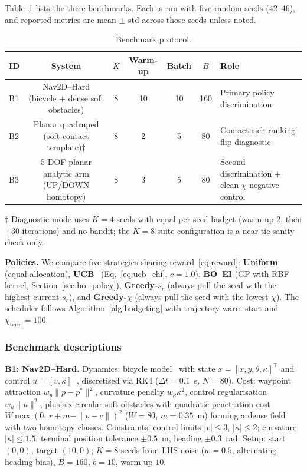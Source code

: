 \documentclass[lettersize,journal]{IEEEtran}
\begin{document}
Table~\ref{tab:protocol} lists the three benchmarks.  Each is run with
five random seeds ($42$--$46$), and reported metrics are mean $\pm$ std
across those seeds unless noted.

\begin{table}[t]
\caption{Benchmark protocol.}
\label{tab:protocol}
\centering
\footnotesize
\setlength{\tabcolsep}{3pt}
\begin{tabular}{lcccccl}
\toprule
ID & System & $K$ & Warm-up & Batch & $B$ & Role \\
\midrule
B1 & Nav2D--Hard (bicycle + dense soft obstacles) & 8 & 10 & 10 & 160 & Primary policy discrimination \\
B2 & Planar quadruped (soft-contact template)$\dagger$ & 8 & 2 & 5 & 80 & Contact-rich ranking-flip diagnostic \\
B3 & 5-DOF planar analytic arm (UP/DOWN homotopy) & 8 & 3 & 5 & 80 & Second discrimination + clean $\chi$ negative control \\
\bottomrule
\end{tabular}

{\footnotesize $\dagger$ Diagnostic mode uses $K{=}4$ seeds with equal
per-seed budget (warm-up 2, then $+30$ iterations) and no bandit; the
$K{=}8$ suite configuration is a near-tie sanity check only.}
\end{table}

\noindent\textbf{Policies.}
We compare five strategies sharing reward~\eqref{eq:reward}:
\textbf{Uniform} (equal allocation), \textbf{UCB}~\cite{auer2002}
(Eq.~\eqref{eq:ucb_chi}, $c=1.0$), \textbf{BO--EI} (GP with RBF kernel,
Section~\ref{sec:bo_policy}), \textbf{Greedy-$s_r$} (always pull the seed
with the highest current $s_r$), and \textbf{Greedy-$\chi$} (always pull the
seed with the lowest $\chi$).  The scheduler follows
Algorithm~\ref{alg:budgeting} with trajectory warm-start and $\chi_{\mathrm{term}}=100$.

\subsubsection{Benchmark descriptions}

\textbf{B1: Nav2D--Hard.}
Dynamics: bicycle model~\cite{zhu2024} with state
$x = [x,y,\theta,\kappa]^\top$ and control $u = [v,\dot\kappa]^\top$,
discretised via RK4 ($\Delta t = 0.1$~s, $N = 80$).
Cost: waypoint attraction $w_p\|p - p^*\|^2$, curvature penalty
$w_\kappa\kappa^2$, control regularisation $w_u\|u\|^2$, plus six circular
soft obstacles with quadratic penetration cost
$W\max(0,\,r+m-\|p-c\|)^2$ ($W=80$, $m=0.35$~m) forming a dense field with
two homotopy classes.
Constraints: control limits $|v| \le 3$, $|\dot\kappa| \le 2$; curvature
$|\kappa| \le 1.5$; terminal position tolerance $\pm 0.5$~m, heading
$\pm 0.3$~rad.
Setup: start $(0,0)$, target $(10,0)$; $K=8$ seeds from LHS noise
($w=0.5$, alternating heading bias), $B=160$, $b=10$, warm-up $10$.
\end{document}
